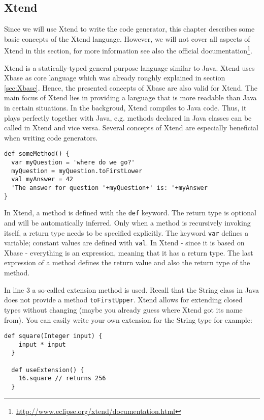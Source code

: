 \subsection{Xtend}
 
Since we will use Xtend to write the code generator, this chapter describes some
basic concepts of the Xtend language. However, we will not cover all aspects of
Xtend in this section, for more information see also the official documentation\footnote{\url{http://www.eclipse.org/xtend/documentation.html}}.

Xtend is a statically-typed general purpose language similar to Java. Xtend uses
Xbase as core language which was already roughly explained in section \ref{sec:Xbase}.
Hence, the presented concepts of Xbase are also valid for Xtend. The main focus
of Xtend lies in providing a language that is more readable than Java in certain
situations. In the backgroud, Xtend compiles to Java code. Thus, it plays perfectly
together with Java, e.g. methods declared in Java classes can be called in Xtend
and vice versa. Several concepts of Xtend are especially beneficial when writing code
generators. 

\begin{lstlisting}[language=Xtend]
def someMethod() {
  var myQuestion = 'where do we go?'
  myQuestion = myQuestion.toFirstLower
  val myAnswer = 42
  'The answer for question '+myQuestion+' is: '+myAnswer
}
\end{lstlisting}

In Xtend, a method is defined with the \texttt{def} keyword. The return type is
optional and will be automatically inferred. Only when a method is recursively
invoking itself, a return type needs to be specified explicitly. The keyword 
\texttt{var} defines a variable; constant values are defined with \texttt{val}.
In Xtend - since it is based on Xbase - everything is an expression, meaning that 
it has a return type. The last expression of a method defines the return value
and also the return type of the method.

In line 3 a so-called extension method is used. Recall that the String class in 
Java does not provide a method \texttt{toFirstUpper}. Xtend allows for extending
closed types without changing (maybe you already guess where Xtend got its name from).
You can easily write your own extension for the String type for example:

\begin{lstlisting}[language=Xtend]
  def square(Integer input) {
  	input * input
  }
  
  def useExtension() {
  	16.square // returns 256
  }
\end{lstlisting}


